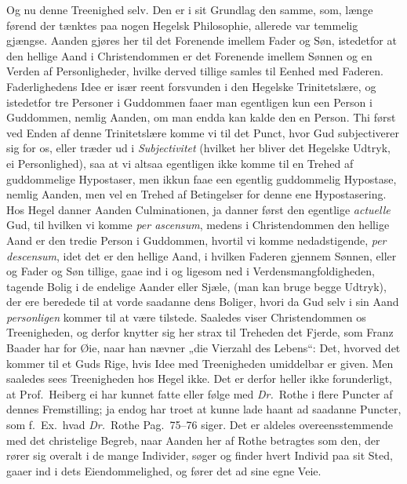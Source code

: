 \documentclass[12pt,a4paper]{book}
\newcommand{\apage}[1]{\marginnote{\footnotesize\textit{[#1]}}}
\begin{document}
Og nu denne Treenighed selv. Den er i sit Grundlag den samme, som, længe førend
der tænktes paa nogen Hegelsk Philosophie, allerede var temmelig gjængse. Aanden
gjøres her til det Forenende imellem Fader og Søn, istedetfor at den hellige
Aand i Christendommen er det Forenende imellem Sønnen og en Verden af
Personligheder, hvilke derved tillige samles til Eenhed med Faderen.
Faderlighedens Idee er især reent forsvunden i den Hegelske Trinitetslære, og
istedetfor tre Personer i Guddommen faaer man egentligen kun een Person i
Guddommen, nemlig Aanden, om man endda kan kalde den en Person. Thi først ved
Enden af denne Trinitetslære komme vi til det Punct, hvor Gud subjectiverer sig
for os, eller træder ud i \emph{Subjectivitet} (hvilket her bliver det Hegelske Udtryk,
ei Personlighed), saa at vi altsaa egentligen ikke komme til en Trehed af
guddommelige Hypostaser, men ikkun faae een egentlig guddommelig Hypostase,
nemlig Aanden, men vel en Trehed af Betingelser for denne ene Hypostasering. Hos
Hegel danner Aanden Culminationen, ja danner først den egentlige \emph{actuelle} Gud,
til hvilken vi komme \textit{per ascensum}, medens i Christendommen den hellige
Aand er den tredie Person i Guddommen, hvortil vi komme nedadstigende,
\textit{per descensum}, idet det er den hellige Aand, i hvilken Faderen gjennem
Sønnen, eller og Fader og Søn tillige, gaae ind i \apage{139} og ligesom ned i
Verdensmangfoldigheden, tagende Bolig i de endelige Aander eller Sjæle, (man kan
bruge begge Udtryk), der ere beredede til at vorde saadanne dens Boliger, hvori
da Gud selv i sin Aand \emph{personligen} kommer til at være tilstede. Saaledes viser
Christendommen os Treenigheden, og derfor knytter sig her strax til Treheden det
Fjerde, som Franz Baader har for Øie, naar han nævner „die Vierzahl des Lebens“:
Det, hvorved det kommer til et Guds Rige, hvis Idee med Treenigheden umiddelbar
er given. Men saaledes sees Treenigheden hos Hegel ikke. Det er derfor heller
ikke forunderligt, at Prof.\ Heiberg ei har kunnet fatte eller følge med
\textit{Dr.}\ Rothe i flere Puncter af dennes Fremstilling; ja endog har troet
at kunne lade haant ad saadanne Puncter, som f.\ Ex.\ hvad \textit{Dr.}\ Rothe
Pag.\ 75--76 siger. Det er aldeles overeensstemmende med det christelige Begreb,
naar Aanden her af Rothe betragtes som den, der rører sig overalt i de mange
Individer, søger og finder hvert Individ paa sit Sted, gaaer ind i dets
Eiendommelighed, og fører det ad sine egne Veie.
\end{document}
